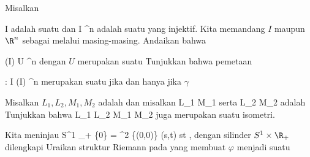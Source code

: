 {}
{

Misalkan

\mavergleichskette
{\vergleichskette
{ I
}
{ \subseteq }{ \R
}
{  }{
}
{    }{
}
{   }{
}
}
{}{}{}
adalah suatu
dan
\maabbdisp {\gamma} { I } { \R^n
} {}
adalah suatu
yang injektif. Kita memandang $I$ maupun $\R^n$ sebagai
melalui
masing-masing. Andaikan bahwa

\mavergleichskette
{\vergleichskette
{ \gamma(I)
}
{ \subseteq }{ U
}
{ \subseteq }{ \R^n
}
{    }{
}
{   }{
}
}
{}{}{}
dengan $U$
merupakan suatu
Tunjukkan bahwa pemetaan

\mavergleichskettedisp
{\vergleichskette
{ \gamma
}
{ :} { I
}
{ \longrightarrow} { \gamma(I) \subseteq \R^n
}
{ } {
}
{ } {
}
}
{}{}{}
merupakan suatu
jika dan hanya jika $\gamma$

}
{} {}

{}
{

Misalkan $L_1,L_2,M_1,M_2$ adalah
dan misalkan
 {L_1 } { M_1
} {}
serta
 {L_2 } { M_2
} {}
adalah
Tunjukkan bahwa
 {L_1 \times L_2 } { M_1 \times M_2
} {}
juga merupakan suatu isometri.

}
{} {}

{}
{

Kita meninjau
\maabbeledisp {\varphi} {S^1 \times \R_+} { \Complex \setminus \{0\}  =  \R^2 \setminus \{(0,0)\}
} {(s,t) } { st
} {,}
dengan silinder $S^1 \times \R_+$ dilengkapi
Uraikan struktur Riemann pada
yang membuat $\varphi$ menjadi suatu

}
{} {}

